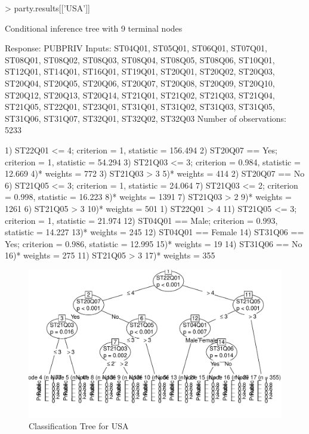 \documentclass[letterpaper,11pt]{article}
\begin{document}
\begin{Schunk}
\begin{Sinput}
> party.results[['USA']]
\end{Sinput}
\begin{Soutput}
	 Conditional inference tree with 9 terminal nodes

Response:  PUBPRIV 
Inputs:  ST04Q01, ST05Q01, ST06Q01, ST07Q01, ST08Q01, ST08Q02, ST08Q03, ST08Q04, ST08Q05, ST08Q06, ST10Q01, ST12Q01, ST14Q01, ST16Q01, ST19Q01, ST20Q01, ST20Q02, ST20Q03, ST20Q04, ST20Q05, ST20Q06, ST20Q07, ST20Q08, ST20Q09, ST20Q10, ST20Q12, ST20Q13, ST20Q14, ST21Q01, ST21Q02, ST21Q03, ST21Q04, ST21Q05, ST22Q01, ST23Q01, ST31Q01, ST31Q02, ST31Q03, ST31Q05, ST31Q06, ST31Q07, ST32Q01, ST32Q02, ST32Q03 
Number of observations:  5233 

1) ST22Q01 <= 4; criterion = 1, statistic = 156.494
  2) ST20Q07 == {Yes}; criterion = 1, statistic = 54.294
    3) ST21Q03 <= 3; criterion = 0.984, statistic = 12.669
      4)*  weights = 772 
    3) ST21Q03 > 3
      5)*  weights = 414 
  2) ST20Q07 == {No}
    6) ST21Q05 <= 3; criterion = 1, statistic = 24.064
      7) ST21Q03 <= 2; criterion = 0.998, statistic = 16.223
        8)*  weights = 1391 
      7) ST21Q03 > 2
        9)*  weights = 1261 
    6) ST21Q05 > 3
      10)*  weights = 501 
1) ST22Q01 > 4
  11) ST21Q05 <= 3; criterion = 1, statistic = 21.974
    12) ST04Q01 == {Male}; criterion = 0.993, statistic = 14.227
      13)*  weights = 245 
    12) ST04Q01 == {Female}
      14) ST31Q06 == {Yes}; criterion = 0.986, statistic = 12.995
        15)*  weights = 19 
      14) ST31Q06 == {No}
        16)*  weights = 275 
  11) ST21Q05 > 3
    17)*  weights = 355 
\end{Soutput}
\end{Schunk}

\begin{figure}[tp]
\begin{center}
\includegraphics{multilevelPSA-014}
\caption{Classification Tree for USA}
\label{fig:usatree}
\end{center}
\end{figure}
\end{document}

